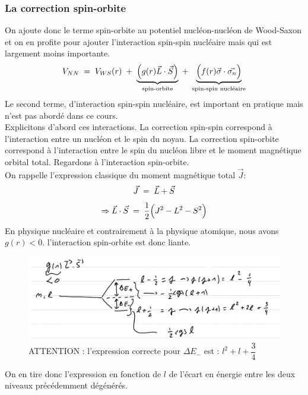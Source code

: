 \subsubsection{La correction spin-orbite}
On ajoute donc le terme spin-orbite au potentiel nucléon-nucléon de Wood-Saxon et on en profite pour ajouter l'interaction spin-spin nucléaire mais qui est largement moins importante.
\begin{equation*}
    V_{NN}\; = \; V_{WS}(r) 
    \; + \; \underbrace{\Big(g(r)\vec{L}\cdot\vec{S}\Big)}_\text{spin-orbite}
    \; + \; \underbrace{\Big(f(r)\vec{\sigma}\cdot\vec{\sigma_n}\Big)}_\text{spin-spin nucléaire}
\end{equation*}
Le second terme, d'interaction spin-spin nucléaire, est important en pratique mais n'est pas abordé dans ce cours.\\
Explicitons d'abord ces interactions. La correction spin-spin correspond à l'interaction entre un nucléon et le spin du noyau. La correction spin-orbite correspond à l'interaction entre le spin du nucléon libre et le moment magnétique orbital total. Regardons à l'interaction spin-orbite.\\
On rappelle l'expression classique du moment magnétique total $\vec{J} :$
\begin{equation*}
    \vec{J} \; = \; \vec{L} + \vec{S}
\end{equation*}
\begin{equation*}
    \Rightarrow \vec{L}\cdot\vec{S} \; = \; \dfrac{1}{2} \Big(J^2 - L^2 - S^2\Big)
\end{equation*}
En physique nucléaire et contrairement à la physique atomique, nous avons $g(r) < 0$. l'interaction spin-orbite est donc liante.\\
\begin{figure}
    \centering
    \includegraphics[scale = 0.7]{Images4/spin-orbite_dégén.PNG}
    \caption{ATTENTION : l'expression correcte pour $\Delta E_-$ est : $l^2 + l +\dfrac{3}{4}$}
\end{figure}
On en tire donc l'expression en fonction de $l$ de l'écart en énergie entre les deux niveaux précédemment dégénérés.
